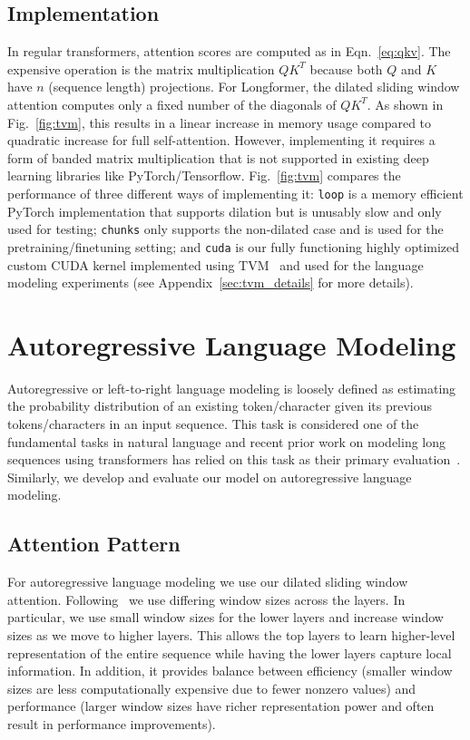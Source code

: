 \documentclass[11pt,a4paper]{article}
\newcommand{\model}{Longformer\xspace}
\begin{document}
\subsection{Implementation}
\label{sec:tvm}
In regular transformers, attention scores are computed as in Eqn.~\ref{eq:qkv}. 
The expensive operation is the matrix multiplication $Q K^{T}$ because both
$Q$ and $K$ have $n$ (sequence length) projections. 
For \model, the dilated sliding window attention computes only a fixed number of the diagonals 
of $Q K^{T}$. As shown in Fig.~\ref{fig:tvm}, this results in a linear increase 
in memory usage compared to quadratic increase for full self-attention.
However, implementing it requires a form of banded matrix multiplication that is not supported in 
existing deep learning libraries like PyTorch/Tensorflow.
Fig.~\ref{fig:tvm} compares the performance of three different ways of implementing it:
\texttt{loop} is a memory efficient PyTorch implementation that supports dilation but is unusably slow and only used for testing;
\texttt{chunks} only supports the non-dilated case and is used for 
the pretraining/finetuning setting;
and \texttt{cuda} is our fully functioning highly optimized custom CUDA kernel implemented using TVM~\cite{tvm} and used for the language modeling experiments (see  Appendix~\ref{sec:tvm_details} for more details).

\section{Autoregressive Language Modeling}
Autoregressive or left-to-right language modeling is loosely defined as estimating the probability distribution of an existing token/character given its previous tokens/characters in an input sequence. 
This task is considered one of the fundamental tasks in natural language and recent prior work on modeling long sequences using transformers 
has relied on this task as their primary evaluation~\cite{transformerxl,compressive,adaptivespan}.
Similarly, we develop and evaluate our model on autoregressive language modeling. 

\subsection{Attention Pattern}
\label{sec:charlm_attn}
For autoregressive language modeling we use our dilated 
sliding window attention. 
Following~\citet{adaptivespan} we use differing window sizes across the layers. In particular, we use small window sizes for the lower layers and increase window sizes 
as we move to higher layers. This allows the top layers to learn higher-level representation of the entire sequence while having the lower layers capture local information. In addition, it provides balance between efficiency (smaller window sizes are less computationally expensive due to fewer nonzero values)
and performance (larger window sizes have richer representation power and often result in performance improvements). 
\end{document}

